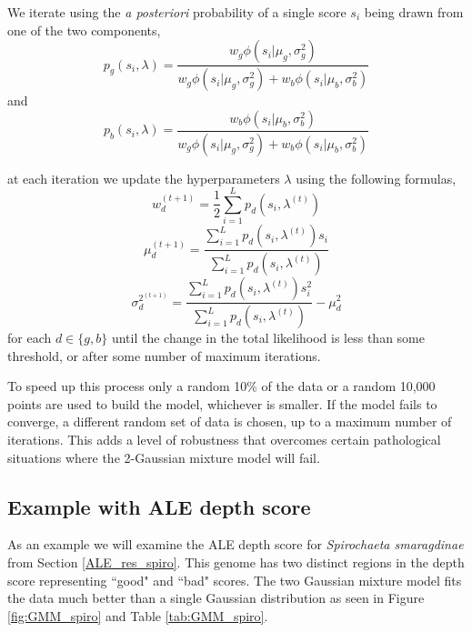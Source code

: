 \documentclass[phd,tocprelim]{cornell}
\begin{document}
We iterate using the {\it a posteriori} probability of a single score $s_{i}$ being drawn from one of the two components,
\begin{equation}
    p_{g}(s_{i}, \lambda) = \frac{w_{g} \phi\left(s_{i} | \mu_{g}, \sigma^{2}_{g}\right)}{w_{g} \phi\left(s_{i} | \mu_{g}, \sigma^{2}_{g}\right) + w_{b} \phi\left(s_{i} | \mu_{b}, \sigma^{2}_{b}\right)}
\end{equation}
and
\begin{equation}
    p_{b}(s_{i}, \lambda) = \frac{w_{b} \phi\left(s_{i} | \mu_{b}, \sigma^{2}_{b}\right)}{w_{g} \phi\left(s_{i} | \mu_{g}, \sigma^{2}_{g}\right) + w_{b} \phi\left(s_{i} | \mu_{b}, \sigma^{2}_{b}\right)}
\end{equation}

at each iteration we update the hyperparameters $\lambda$ using the following formulas,
\begin{equation}
    w_{d}^{(t+1)} = \frac{1}{2}\sum_{i=1}^{L} p_{d}(s_{i}, \lambda^{(t)})
\end{equation}
\begin{equation}
    \mu_{d}^{(t+1)} = \frac{\sum_{i=1}^{L} p_{d}(s_{i}, \lambda^{(t)}) s_{i}}{\sum_{i=1}^{L} p_{d}(s_{i}, \lambda^{(t)})}
\end{equation}
\begin{equation}
    \sigma_{d}^{2^{(t+1)}} = \frac{\sum_{i=1}^{L} p_{d}(s_{i}, \lambda^{(t)}) s_{i}^{2}}{\sum_{i=1}^{L} p_{d}(s_{i}, \lambda^{(t)})} - \mu_{d}^{2}
\end{equation}
for each $d \in \{g, b\}$ until the change in the total likelihood is less than some threshold, or after some number of maximum iterations.

To speed up this process only a random 10\% of the data or a random 10,000 points are used to build the model, whichever is smaller. If the model fails to converge, a different random set of data is chosen, up to a maximum number of iterations. This adds a level of robustness that overcomes certain pathological situations where the 2-Gaussian mixture model will fail.

\subsection{Example with ALE depth score}

As an example we will examine the ALE depth score for {\it Spirochaeta smaragdinae} from Section \ref{ALE_res_spiro}. This genome has two distinct regions in the depth score representing ``good" and ``bad" scores. The two Gaussian mixture model fits the data much better than a single Gaussian distribution as seen in Figure \ref{fig:GMM_spiro} and Table \ref{tab:GMM_spiro}.
\end{document}
